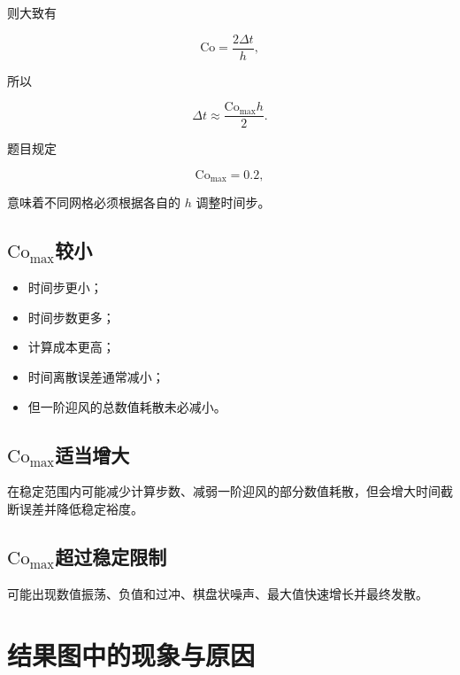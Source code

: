 \documentclass[UTF8,12pt,a4paper,fontset=fandol]{ctexart}
\newcommand{\Co}{\mathrm{Co}}
\newcommand{\Cmax}{\mathrm{Co}_{\max}}
\begin{document}
则大致有

\begin{equation}
\Co
=
\frac{2\Delta t}{h},
\end{equation}

所以

\begin{equation}
\Delta t
\approx
\frac{\Cmax h}{2}.
\end{equation}

题目规定

\begin{equation}
\Cmax=0.2,
\end{equation}

意味着不同网格必须根据各自的 $h$ 调整时间步。

\subsection{\texorpdfstring{$\Cmax$}{Co\_max}较小}

\begin{itemize}
  \item 时间步更小；
  \item 时间步数更多；
  \item 计算成本更高；
  \item 时间离散误差通常减小；
  \item 但一阶迎风的总数值耗散未必减小。
\end{itemize}

\subsection{\texorpdfstring{$\Cmax$}{Co\_max}适当增大}

在稳定范围内可能减少计算步数、减弱一阶迎风的部分数值耗散，但会增大时间截断误差并降低稳定裕度。

\subsection{\texorpdfstring{$\Cmax$}{Co\_max}超过稳定限制}

可能出现数值振荡、负值和过冲、棋盘状噪声、最大值快速增长并最终发散。

\section{结果图中的现象与原因}
\end{document}
